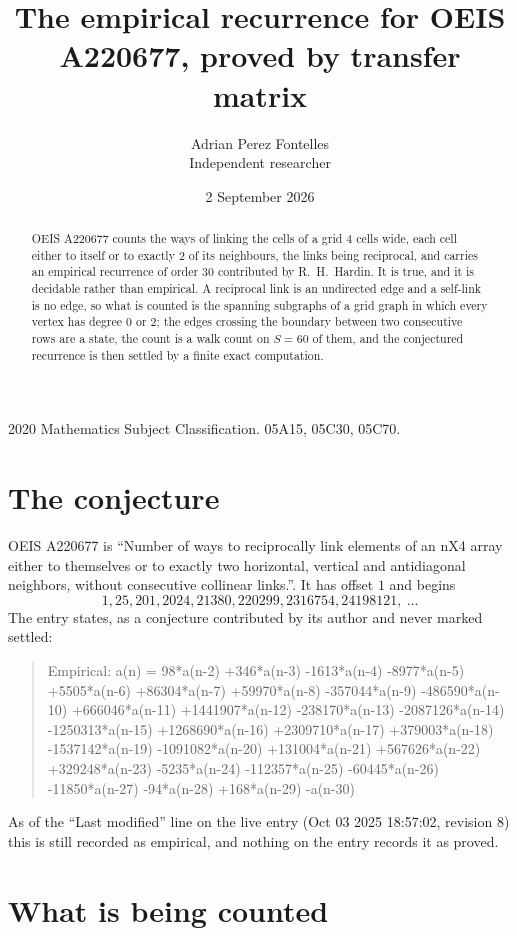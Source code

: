 \documentclass[11pt,a4paper]{article}
\title{The empirical recurrence for OEIS A220677, proved by transfer matrix}
\author{Adrian Perez Fontelles\\ \small Independent researcher}
\date{2 September 2026}
\theoremstyle{plain}
\theoremstyle{definition}
\begin{document}
\maketitle

\begin{abstract}
OEIS A220677 counts the ways of linking the cells of a grid $4$ cells wide, each cell either to
itself or to exactly $2$ of its neighbours, the links being reciprocal, and carries an
empirical recurrence of order $30$ contributed by R.~H.~Hardin. It is true, and it is
decidable rather than empirical. A reciprocal link is an undirected edge and a self-link is
no edge, so what is counted is the spanning subgraphs of a grid graph in which every vertex
has degree $0$ or $2$; the edges crossing the boundary between two consecutive rows are a
state, the count is a walk count on $S=60$ of them, and the conjectured recurrence is then
settled by a finite exact computation.
\end{abstract}

\noindent\small 2020 Mathematics Subject Classification. 05A15, 05C30, 05C70.\normalsize

\section{The conjecture}

OEIS A220677 is ``Number of ways to reciprocally link elements of an nX4 array either to themselves or to exactly two horizontal, vertical and antidiagonal neighbors, without consecutive collinear links.''. It has offset $1$ and begins
\[
1, 25, 201, 2024, 21380, 220299, 2316754, 24198121,\ \dots
\]
The entry states, as a conjecture contributed by its author and never marked settled:
\begin{quote}
Empirical: a(n) = 98*a(n-2) +346*a(n-3) -1613*a(n-4) -8977*a(n-5) +5505*a(n-6) +86304*a(n-7) +59970*a(n-8) -357044*a(n-9) -486590*a(n-10) +666046*a(n-11) +1441907*a(n-12) -238170*a(n-13) -2087126*a(n-14) -1250313*a(n-15) +1268690*a(n-16) +2309710*a(n-17) +379003*a(n-18) -1537142*a(n-19) -1091082*a(n-20) +131004*a(n-21) +567626*a(n-22) +329248*a(n-23) -5235*a(n-24) -112357*a(n-25) -60445*a(n-26) -11850*a(n-27) -94*a(n-28) +168*a(n-29) -a(n-30)
\end{quote}
As of the ``Last modified'' line on the live entry (Oct 03 2025 18:57:02, revision 8) this is still
recorded as empirical, and nothing on the entry records it as proved.

\section{What is being counted}
\end{document}
